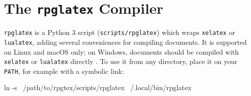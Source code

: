 \chapter{The \texttt{rpglatex} Compiler}\label{S:rpglatex}

	\texttt{rpglatex} is a Python 3 script (\texttt{scripts/rpglatex}) which wraps \texttt{xelatex} or \texttt{lualatex}, adding several conveniences for compiling \rpgtex{} documents. It is supported on Linux and macOS only; on Windows, documents should be compiled with \texttt{xelatex} or \texttt{lualatex} directly . To use it from any directory, place it on your \texttt{PATH}, for example with a symbolic link:
	\begin{BashBlock}
		ln -s ~/path/to/rpgtex/scripts/rpglatex ~/.local/bin/rpglatex
	\end{BashBlock}

